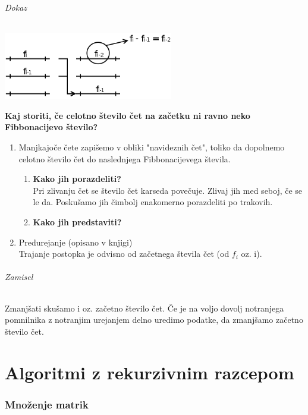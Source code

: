 \documentclass[a4paper,10pt]{article}
\begin{document}
\paragraph{Dokaz}
	\begin{center}
	\includegraphics[width=7.4cm,height=2.95cm]{Slike/PolifaznoUrejanjeDokaz.png}
	\end{center}
\textbf{Kaj storiti, \v ce celotno \v stevilo \v cet na za\v cetku ni ravno neko Fibbonacijevo \v stevilo?}
\begin{enumerate}
\item Manjkajo\v ce \v cete zapi\v semo v obliki "navideznih \v cet", toliko da dopolnemo celotno \v stevilo \v cet do naslednjega Fibbonacijevega \v stevila.
	\begin{enumerate}
	\item \textbf{Kako jih porazdeliti?}\\
		Pri zlivanju \v cet se \v stevilo \v cet karseda pove\v cuje. Zlivaj jih med seboj, \v ce se le da. Posku\v samo jih \v cimbolj enakomerno porazdeliti po trakovih.
	\item \textbf{Kako jih predstaviti?}
	\end{enumerate}
\item Predurejanje (opisano v knjigi)\\
	Trajanje postopka je odvisno od za\v cetnega \v stevila \v cet (od $f_i$ oz. i).
\end{enumerate}

\paragraph{Zamisel}
Zmanj\v sati sku\v samo i oz. za\v cetno \v stevilo \v cet. \v Ce je na voljo dovolj notranjega pomnilnika z notranjim urejanjem delno uredimo podatke, da zmanj\v samo za\v cetno \v stevilo \v cet.

\part{Algoritmi z rekurzivnim razcepom}

\section{Mno\v zenje matrik}
\end{document}
